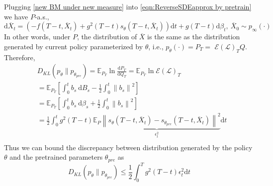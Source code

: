 \documentclass{article}
\theoremstyle{plain}
\theoremstyle{definition}
\theoremstyle{remark}
\begin{document}
Plugging \eqref{new BM under new measure} into \eqref{eqn:ReverseSDEapprox by pretrain} we have $P$-a.s.,
\begin{equation}
\mathrm{d} \overline{X}_t = \left(-f(T-t,\overline{X}_t) + g^2(T-t) s_{\theta}(T-t, \overline{X}_t)  \right) \mathrm{d}t + g(T-t) \mathrm{d}\beta_t,\ \overline{X}_0\sim p_\infty(\cdot)
\end{equation}
In other words, under $P$, the distribution of $\overline{X}$ is the same as the distribution generated by current policy parameterized by $\theta$, i.e., $p_\theta(\cdot)=P_T=$ $\mathcal{E}(\mathcal{L})_T Q$. Therefore,
$$
\begin{aligned}
& D_{KL}\left(p_{\theta}\|p_{\theta_{pre}}\right)=\mathbb{E}_{P_T} \ln \frac{\mathrm{d} P_T}{\mathrm{d} Q_T}=\mathbb{E}_{P_T} \ln \mathcal{E}(\mathcal{L})_T \\
& =\mathbb{E}_{P_T}\left[\int_0^t b_s \mathrm{~d} B_s-\frac{1}{2} \int_0^t\left\|b_s\right\|^2\right] \\
& =\mathbb{E}_{P_T}\left[\int_0^t b_s \mathrm{~d} \beta_s+\frac{1}{2} \int_0^t\left\|b_s\right\|^2\right]\\
& =\frac{1}{2} \int_0^tg^2(T-t)\underbrace{\mathbb{E}_{P}\left\|s_{\theta}(T-t, \overline{X}_t)-s_{\theta_{pre}}(T-t, \overline{X}_t)\right\|^2}_{\epsilon_t^2}\mathrm{d}t\\
\end{aligned}
$$
Thus we can bound the discrepancy between distribution generated by the policy $\theta$ and the pretrained parameters $\theta_{pre}$ as 
\begin{equation}
D_{KL}(p_{\theta}\|p_{\theta_{pre}})\leq \frac{1}{2}\int_{0}^{T}g^2(T-t)\epsilon_t^2\mathrm{d}t
\end{equation}
\end{document}
